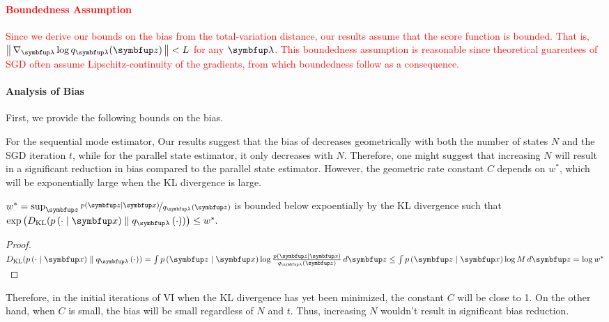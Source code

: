 \textcolor{red}{
  \paragraph{Boundedness Assumption}
Since we derive our bounds on the bias from the total-variation distance, our results assume that the score function is bounded.
That is, \(\norm{\nabla_{\vlambda} \log q_{\vlambda}(\vz)} < L\) for any \(\vlambda\).
This boundedness assumption is reasonable since theoretical guarentees of SGD often assume Lipschitz-continuity of the gradients, from which boundedness follow as a consequence.
}

\paragraph{Analysis of Bias}
First, we provide the following bounds on the bias.



%
For the sequential mode estimator, Our results suggest that the bias of decreases geometrically with both the number of states \(N\) and the SGD iteration \(t\), while for the parallel state estimator, it only decreases with \(N\).
Therefore, one might suggest that increasing \(N\) will result in a significant reduction in bias compared to the parallel state estimator.
However, the geometric rate constant \(C\) depends on \(w^*\), which will be exponentially large when the KL divergence is large.
%
\begin{proposition}
  \(w^* = \sup_{\vz} \nicefrac{p\left(\vz\mid\vx\right)}{q_{\vlambda}\left(\vz\right)} \) is bounded below expoentially by the KL divergence such that
  \(
  \exp\left(\DKL{p\left(\cdot\mid\vx\right)}{ q_{\vlambda}\left(\cdot\right) }\right) \leq w^*.
  \)
  \begin{proof}
    \(
    \DKL{p\left(\cdot\mid\vx\right)}{ q_{\vlambda}\left(\cdot\right) }
    = \int p\left(\vz\mid\vx\right) \log \frac{p\left(\vz\mid\vx\right)}{q_{\vlambda}\left(\vz\right)}\,d\vz
    \leq \int p\left(\vz\mid\vx\right) \log M \, d\vz = \log w^*
    \)
  \end{proof}
\end{proposition}
%
Therefore, in the initial iterations of VI when the KL divergence has yet been minimized, the constant \(C\) will be close to 1.
On the other hand, when \(C\) is small, the bias will be small regardless of \(N\) and \(t\).
Thus, increasing \(N\) wouldn't result in significant bias reduction.





